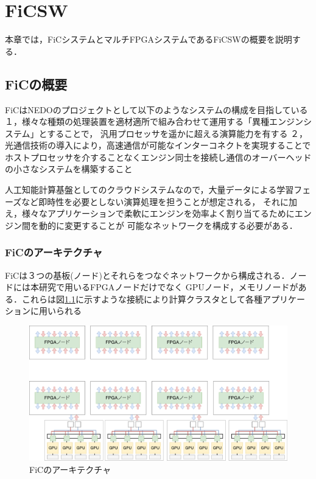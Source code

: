 \chapter{FiCSW}
{
\label{chap:ficsw}
本章では，FiCシステムとマルチFPGAシステムであるFiCSWの概要を説明する．

\section{FiCの概要}
\label{sec:about_fic}
FiCはNEDOのプロジェクトとして以下のようなシステムの構成を目指している
１，様々な種類の処理装置を適材適所で組み合わせて運用する「異種エンジンシステム」とすることで，
汎用プロセッサを遥かに超える演算能力を有する
２，光通信技術の導入により，高速通信が可能なインターコネクトを実現することで
ホストプロセッサを介することなくエンジン同士を接続し通信のオーバーヘッドの小さなシステムを構築すること

人工知能計算基盤としてのクラウドシステムなので，大量データによる学習フェーズなど即時性を必要としない演算処理を担うことが想定される，
それに加え，様々なアプリケーションで柔軟にエンジンを効率よく割り当てるためにエンジン間を動的に変更することが
可能なネットワークを構成する必要がある．

\subsection{FiCのアーキテクチャ}
\label{sec:arch_fic}
FiCは３つの基板(ノード)とそれらをつなぐネットワークから構成される．ノードには本研究で用いるFPGAノードだけでなく
GPUノード，メモリノードがある．これらは図\ref{fig:arch_fic}に示すような接続により計算クラスタとして各種アプリケーションに用いられる

\begin{figure}[h]
  \centering
  \includegraphics[width=12cm]{./chap3/fig/arch_fic.pdf}
  \caption{FiCのアーキテクチャ}
  \label{fig:arch_fic}
\end{figure}

}
